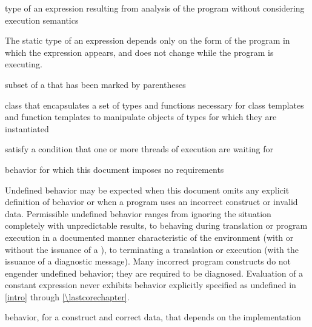 %
type of an expression resulting from
analysis of the program without considering execution semantics

\begin{defnote}
The static type of an expression depends only on the form of the program in
which the expression appears, and does not change while the program is
executing.
\end{defnote}

%
subset of a  that has
been marked by parentheses

%
class that encapsulates a set of types and functions necessary for class templates and
function templates to manipulate objects of types for which they are instantiated

%
satisfy a condition that one or more  threads of execution are waiting for

%
behavior for which this document
imposes no requirements

\begin{defnote}
Undefined behavior may be expected when
this document omits any explicit
definition of behavior or when a program uses an incorrect construct or invalid data.
Permissible undefined behavior ranges
from ignoring the situation completely with unpredictable results, to
behaving during translation or program execution in a documented manner
characteristic of the environment (with or without the issuance of a
), to terminating a translation or execution (with the
issuance of a diagnostic message). Many incorrect program constructs do
not engender undefined behavior; they are required to be diagnosed.
Evaluation of a constant expression never exhibits behavior explicitly
specified as undefined in \ref{intro} through \ref{\lastcorechapter}.
\end{defnote}

%
behavior, for a  construct and correct data, that
depends on the implementation

